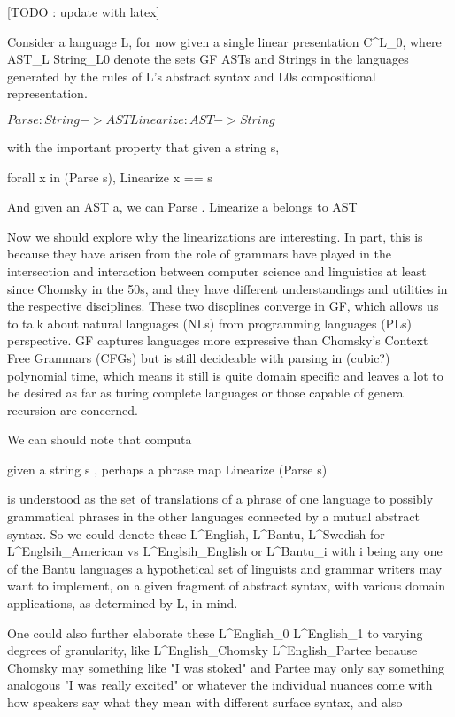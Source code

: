 [TODO : update with latex]

Consider a language L, for now given a single linear presentation C^L_0, where
AST_L String_L0 denote the sets GF ASTs and Strings in the languages generated
by the rules of L's abstract syntax and L0s compositional representation.

  $Parse : String -> {AST} Linearize : AST -> String$

with the important property that given a string s,

  forall x in (Parse s), Linearize x == s

And given an AST a, we can Parse . Linearize a belongs to {AST}

Now we should explore why the linearizations are interesting. In part, this is
because they have arisen from the role of grammars have played in the
intersection and interaction between computer science and linguistics at least
since Chomsky in the 50s, and they have different understandings and utilities
in the respective disciplines. These two discplines converge in GF, which allows
us to talk about natural languages (NLs) from programming languages (PLs)
perspective. GF captures languages more expressive than Chomsky's Context Free
Grammars (CFGs) but is still decideable with parsing in (cubic?) polynomial
time, which means it still is quite domain specific and leaves a lot to be
desired as far as turing complete languages or those capable of general
recursion are concerned.

We can should note that computa

  given a string s , perhaps a phrase map Linearize (Parse s)

is understood as the set of translations of a phrase of one language to possibly
grammatical phrases in the other languages connected by a mutual abstract
syntax. So we could denote these L^English, L^Bantu, L^Swedish for
L^Englsih_American vs L^Englsih_English or L^Bantu_i with i being any one of the
Bantu languages a hypothetical set of linguists and grammar writers may want to
implement, on a given fragment of abstract syntax, with various domain
applications, as determined by L, in mind.

  One could also further elaborate these L^English_0 L^English_1 to varying
degrees of granularity, like L^English_Chomsky L^English_Partee because Chomsky
may something like "I was stoked" and Partee may only say something analogous "I
was really excited" or whatever the individual nuances come with how speakers
say what they mean with different surface syntax, and also

